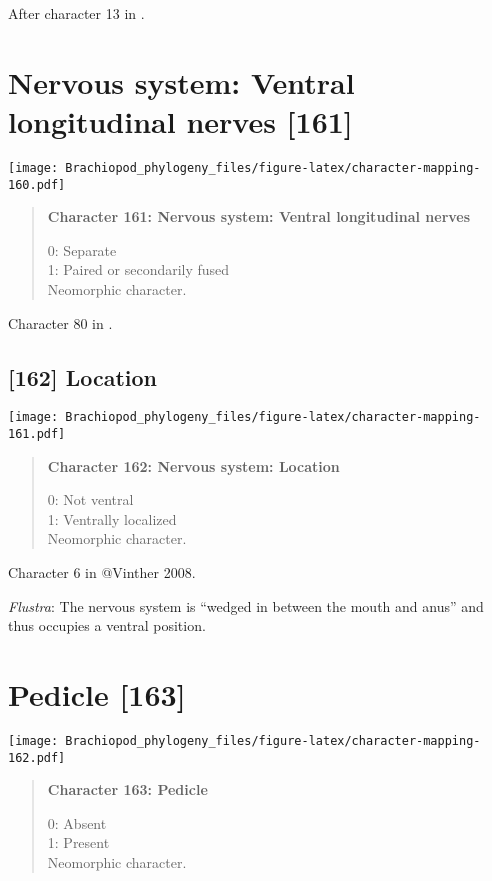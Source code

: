 \documentclass[openany]{book}
\theoremstyle{definition}
\theoremstyle{definition}
\theoremstyle{definition}
\theoremstyle{remark}
\begin{document}
After character 13 in \citet{Haszprunar1996}.

\section{Nervous system: Ventral longitudinal nerves
{[}161{]}}\label{nervous-system-ventral-longitudinal-nerves-161}

\texttt{[image: Brachiopod\_phylogeny\_files/figure-latex/character-mapping-160.pdf]}

\begin{quote}
\textbf{Character 161: Nervous system: Ventral longitudinal nerves}

0: Separate\\
1: Paired or secondarily fused\\
Neomorphic character.
\end{quote}

Character 80 in \citet{Glenner2004}.

\subsection*{{[}162{]} Location}\label{location}

\texttt{[image: Brachiopod\_phylogeny\_files/figure-latex/character-mapping-161.pdf]}

\begin{quote}
\textbf{Character 162: Nervous system: Location}

0: Not ventral\\
1: Ventrally localized\\
Neomorphic character.
\end{quote}

Character 6 in @Vinther 2008.

\hypertarget{Flustra-coding-162}{}
\emph{Flustra}: The nervous system is ``wedged in between the mouth and
anus'' \citep{Schwaha2015} and thus occupies a ventral position.

\section{Pedicle {[}163{]}}\label{pedicle-163}

\texttt{[image: Brachiopod\_phylogeny\_files/figure-latex/character-mapping-162.pdf]}

\begin{quote}
\textbf{Character 163: Pedicle}

0: Absent\\
1: Present\\
Neomorphic character.
\end{quote}
\end{document}
